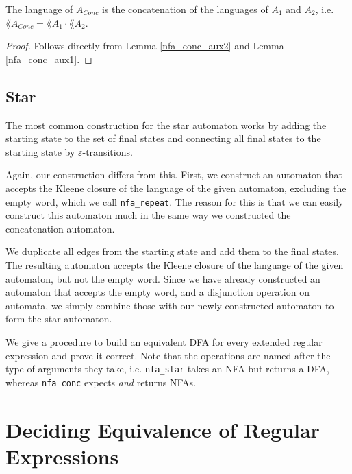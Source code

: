 \begin{corollary}
    The language of $A_{Conc}$ is the concatenation of the languages of $A_1$ and $A_2$, i.e. $\lang{A_{Conc}} = \lang{A_1} \cdot \lang{A_2}$.
\end{corollary}
\begin{proof}
    Follows directly from Lemma \ref{nfa_conc_aux2} and Lemma \ref{nfa_conc_aux1}. 
\end{proof}



\subsection{Star}
The most common construction for the star automaton works by adding the starting state
to the set of final states and connecting all final states to the starting state by $\varepsilon$-transitions.

Again, our construction differs from this.
First, we construct an automaton that accepts the Kleene closure of the language
of the given automaton, excluding the empty word, which we call \lstinline{nfa_repeat}.
The reason for this is that we can easily construct this automaton much in the same way
we constructed the concatenation automaton.

We duplicate all edges from the starting state and add them to the final states.
The resulting automaton accepts the Kleene closure of the language of the given automaton, but not the empty word.
Since we have already constructed an automaton that accepts the empty word, 
and a disjunction operation on automata, we simply combine those with our newly constructed automaton 
to form the star automaton.



We give a procedure to build an equivalent DFA for every extended regular expression and prove it correct.
Note that the operations are named after the type of arguments they take, 
i.e. \lstinline{nfa_star} takes an NFA but returns a DFA,
whereas \lstinline{nfa_conc} expects \textit{and} returns NFAs. 



\section{Deciding Equivalence of Regular Expressions}

